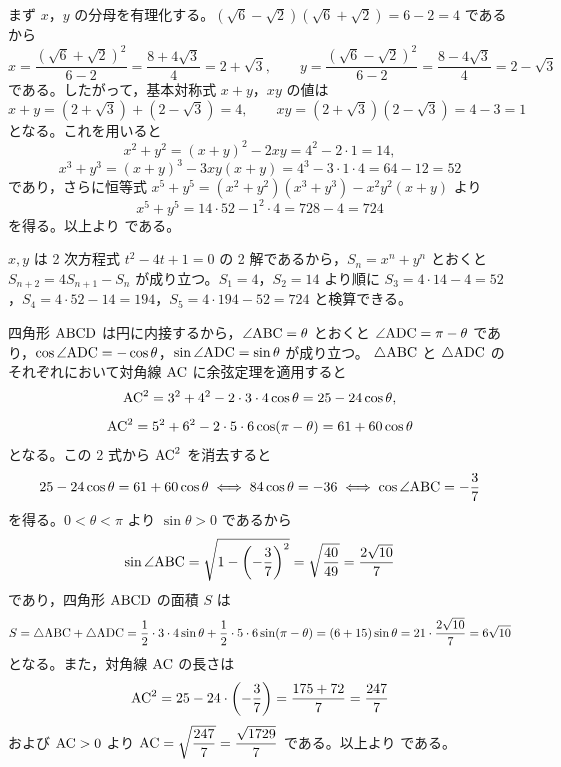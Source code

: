 
まず $x$，$y$ の分母を有理化する。$(\sqrt{6}-\sqrt{2})(\sqrt{6}+\sqrt{2})=6-2=4$ であるから
\[
  x=\frac{(\sqrt{6}+\sqrt{2})^{2}}{6-2}=\frac{8+4\sqrt{3}}{4}=2+\sqrt{3},\qquad
  y=\frac{(\sqrt{6}-\sqrt{2})^{2}}{6-2}=\frac{8-4\sqrt{3}}{4}=2-\sqrt{3}
\]
である。したがって，基本対称式 $x+y$，$xy$ の値は
\[
  x+y=(2+\sqrt{3})+(2-\sqrt{3})=4,\qquad
  xy=(2+\sqrt{3})(2-\sqrt{3})=4-3=1
\]
となる。これを用いると
\[
  x^{2}+y^{2}=(x+y)^{2}-2xy=4^{2}-2\cdot 1=14,
\]
\[
  x^{3}+y^{3}=(x+y)^{3}-3xy(x+y)=4^{3}-3\cdot 1\cdot 4=64-12=52
\]
であり，さらに恒等式 $x^{5}+y^{5}=(x^{2}+y^{2})(x^{3}+y^{3})-x^{2}y^{2}(x+y)$ より
\[
  x^{5}+y^{5}=14\cdot 52-1^{2}\cdot 4=728-4=724
\]
を得る。以上より
である。

\begin{betsu}[別解：漸化式 $S_{n}=4S_{n-1}-S_{n-2}$ を用いる方法]
$x, y$ は 2 次方程式 $t^{2}-4t+1=0$ の 2 解であるから，$S_{n}=x^{n}+y^{n}$ とおくと $S_{n+2}=4S_{n+1}-S_{n}$ が成り立つ。$S_{1}=4$，$S_{2}=14$ より順に $S_{3}=4\cdot 14-4=52$，$S_{4}=4\cdot 52-14=194$，$S_{5}=4\cdot 194-52=724$ と検算できる。
\end{betsu}

四角形 $\mathrm{ABCD}$ は円に内接するから，$\angle\mathrm{ABC}=\theta$ とおくと $\angle\mathrm{ADC}=\pi-\theta$ であり，$\cos\angle\mathrm{ADC}=-\cos\theta$，$\sin\angle\mathrm{ADC}=\sin\theta$ が成り立つ。
$\triangle\mathrm{ABC}$ と $\triangle\mathrm{ADC}$ のそれぞれにおいて対角線 $\mathrm{AC}$ に余弦定理を適用すると
\[
  \mathrm{AC}^{2}=3^{2}+4^{2}-2\cdot 3\cdot 4\cos\theta=25-24\cos\theta,
\]
\[
  \mathrm{AC}^{2}=5^{2}+6^{2}-2\cdot 5\cdot 6\cos(\pi-\theta)=61+60\cos\theta
\]
となる。この 2 式から $\mathrm{AC}^{2}$ を消去すると
\[
  25-24\cos\theta=61+60\cos\theta \iff 84\cos\theta=-36 \iff \cos\angle\mathrm{ABC}=-\frac{3}{7}
\]
を得る。$0<\theta<\pi$ より $\sin\theta>0$ であるから
\[
  \sin\angle\mathrm{ABC}=\sqrt{1-\left(-\frac{3}{7}\right)^{2}}=\sqrt{\frac{40}{49}}=\frac{2\sqrt{10}}{7}
\]
であり，四角形 $\mathrm{ABCD}$ の面積 $S$ は
\[
  S=\triangle\mathrm{ABC}+\triangle\mathrm{ADC}=\frac{1}{2}\cdot 3\cdot 4\sin\theta+\frac{1}{2}\cdot 5\cdot 6\sin(\pi-\theta)=(6+15)\sin\theta=21\cdot\frac{2\sqrt{10}}{7}=6\sqrt{10}
\]
となる。また，対角線 $\mathrm{AC}$ の長さは
\[
  \mathrm{AC}^{2}=25-24\cdot\left(-\frac{3}{7}\right)=\frac{175+72}{7}=\frac{247}{7}
\]
および $\mathrm{AC}>0$ より $\mathrm{AC}=\sqrt{\dfrac{247}{7}}=\dfrac{\sqrt{1729}}{7}$ である。以上より
である。


